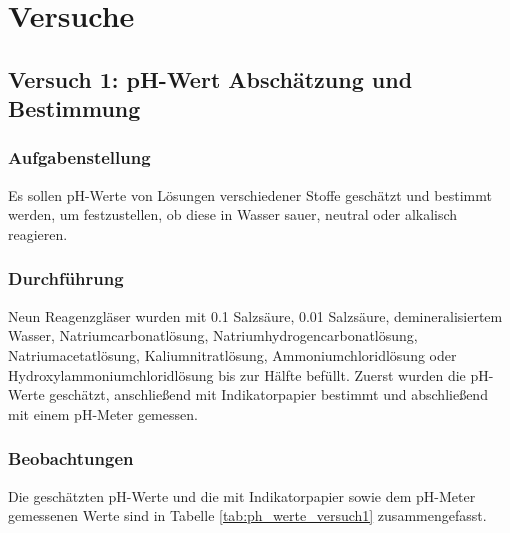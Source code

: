 \section{Versuche}

\subsection{Versuch 1: pH-Wert Abschätzung und Bestimmung}
\subsubsection{Aufgabenstellung}
Es sollen  pH-Werte von Lösungen verschiedener Stoffe geschätzt und bestimmt werden, um festzustellen, ob diese in Wasser sauer, neutral oder alkalisch reagieren.
\subsubsection{Durchführung}
Neun Reagenzgläser wurden mit \SI{0.1}{} Salzsäure, \SI{0.01}{} Salzsäure, demineralisiertem Wasser, Natriumcarbonatlösung, Natriumhydrogencarbonatlösung, Natriumacetatlösung, Kaliumnitratlösung, Ammoniumchloridlösung oder Hydroxylammoniumchloridlösung bis zur Hälfte befüllt. Zuerst wurden die pH-Werte geschätzt, anschließend mit Indikatorpapier bestimmt und abschließend mit einem pH-Meter gemessen.

\subsubsection{Beobachtungen}

Die geschätzten pH-Werte und die mit Indikatorpapier sowie dem pH-Meter gemessenen Werte sind in Tabelle \ref{tab:ph_werte_versuch1} zusammengefasst.

